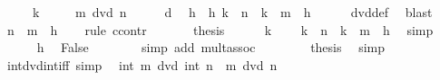 \begin{isabellebody}
\ \ \ \ \ {\isachardoublequoteopen}k\ {\isasymnoteq}\ {}{\isachardoublequoteclose}\isanewline
\ \ \ {\isachardoublequoteopen}m\ dvd\ n{\isachardoublequoteclose}\isanewline
%
\isadelimproof
%
\endisadelimproof
%
\isatagproof
{}\isamarkupfalse%
\ {\isacharminus}{\kern0pt}\isanewline
\ \ \isamarkupfalse%
\ d\ \isamarkupfalse%
\ h\ \ h{\isacharcolon}{\kern0pt}\ {\isachardoublequoteopen}k\ {\isacharasterisk}{\kern0pt}\ n\ {\isacharequal}{\kern0pt}\ k\ {\isacharasterisk}{\kern0pt}\ m\ {\isacharasterisk}{\kern0pt}\ h{\isachardoublequoteclose}\isanewline
\ \ \ \ \isamarkupfalse%
\ dvd{\isacharunderscore}{\kern0pt}def\ \isamarkupfalse%
\ blast\isanewline
\ \ \isamarkupfalse%
\ {\isachardoublequoteopen}n\ {\isacharequal}{\kern0pt}\ m\ {\isacharasterisk}{\kern0pt}\ h{\isachardoublequoteclose}\isanewline
\ \ \isamarkupfalse%
\ {\isacharparenleft}{\kern0pt}rule\ ccontr{\isacharparenright}{\kern0pt}\isanewline
\ \ \ \ \isamarkupfalse%
\ {\isachardoublequoteopen}{\isasymnot}\ {\isacharquery}{\kern0pt}thesis{\isachardoublequoteclose}\isanewline
\ \ \ \ \isamarkupfalse%
\ {\isacartoucheopen}k\ {\isasymnoteq}\ {}{\isacartoucheclose}\ \isamarkupfalse%
\ {\isachardoublequoteopen}k\ {\isacharasterisk}{\kern0pt}\ n\ {\isasymnoteq}\ k\ {\isacharasterisk}{\kern0pt}\ {\isacharparenleft}{\kern0pt}m\ {\isacharasterisk}{\kern0pt}\ h{\isacharparenright}{\kern0pt}{\isachardoublequoteclose}\ \isamarkupfalse%
\ simp\isanewline
\ \ \ \ \isamarkupfalse%
\ h\ \isamarkupfalse%
\ False\isanewline
\ \ \ \ \ \ \isamarkupfalse%
\ {\isacharparenleft}{\kern0pt}simp\ add{\isacharcolon}{\kern0pt}\ mult{\isachardot}{\kern0pt}assoc{\isacharparenright}{\kern0pt}\isanewline
\ \ \isamarkupfalse%
\isanewline
\ \ \isamarkupfalse%
\ \isamarkupfalse%
\ {\isacharquery}{\kern0pt}thesis\ \isamarkupfalse%
\ simp\isanewline
{}\isamarkupfalse%
%
\endisatagproof
{\isafoldproof}%
%
\isadelimproof
\isanewline
%
\endisadelimproof
\isanewline
{}\isamarkupfalse%
\ int{\isacharunderscore}{\kern0pt}dvd{\isacharunderscore}{\kern0pt}int{\isacharunderscore}{\kern0pt}iff\ {\isacharbrackleft}{\kern0pt}simp{\isacharbrackright}{\kern0pt}{\isacharcolon}{\kern0pt}\isanewline
\ \ {\isachardoublequoteopen}int\ m\ dvd\ int\ n\ {\isasymlongleftrightarrow}\ m\ dvd\ n{\isachardoublequoteclose}\isanewline

\end{isabellebody}
